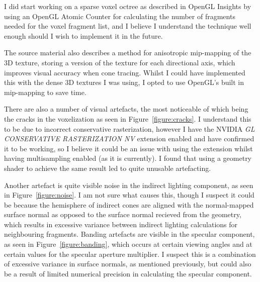 \documentclass[]{acmsiggraph}
\begin{document}
I did start working on a sparse voxel octree as described in OpenGL Insights \cite{crassingreen2012} by using an OpenGL Atomic Counter for calculating the number of fragments needed for the voxel fragment list, and I believe I understand the technique well enough should I wish to implement it in the future.

The source material \cite{crassinneyretsainzgreeneisemann2011} also describes a method for anisotropic mip-mapping of the 3D texture, storing a version of the texture for each directional axis, which improves visual accuracy when cone tracing. Whilst I could have implemented this with the dense 3D textures I was using, I opted to use OpenGL's built in mip-mapping to save time.

There are also a number of visual artefacts, the most noticeable of which being the cracks in the voxelization as seen in Figure~\ref{figure:cracks}. I understand this to be due to incorrect conservative rasterization, however I have the NVIDIA \textit{GL CONSERVATIVE RASTERIZATION NV} extension enabled and have confirmed it to be working, so I believe it could be an issue with using the extension whilst having multisampling enabled (as it is currently). I found that using a geometry shader to achieve the same result led to quite unusable artefacting.

Another artefact is quite visible noise in the indirect lighting component, as seen in Figure~\ref{figure:noise}. I am not sure what causes this, though I suspect it could be because the hemisphere of indirect cones are aligned with the normal-mapped surface normal as opposed to the surface normal recieved from the geometry, which results in excessive variance between indirect lighting calculations for neighbouring fragments. Banding artefacts are visible in the specular component, as seen in Figure~\ref{figure:banding}, which occurs at certain viewing angles and at certain values for the specular aperture multiplier. I suspect this is a combination of excessive variance in surface normals, as mentioned previously, but could also be a result of limited numerical precision in calculating the specular component.
\end{document}
